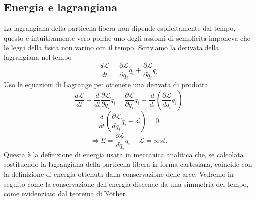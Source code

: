 \documentclass[
10pt, %
a4paper, %
oneside, %
headinclude,footinclude, %
BCOR5mm, %
]{scrartcl}
\begin{document}
\subsection{Energia e lagrangiana}\label{subsec:energia-lagra}
La lagrangiana della particella libera non dipende esplicitamente dal tempo, questo è intuitivamente vero poiché uno degli assiomi di semplicità imponeva che le leggi della fisica non varino con il tempo. Scriviamo la derivata della lagrangiana nel tempo
\[\frac{d\mathcal{L}}{dt} = \frac{\partial \mathcal{L}}{\partial q_i}\dot{q}_i+ \frac{\partial \mathcal{L}}{\partial \dot{q}_i}\ddot{q}_i\]
Uso le equazioni di Lagrange per ottenere una derivata di prodotto
\[\frac{d\mathcal{L}}{dt} = \frac{d}{dt}\frac{\partial \mathcal{L}}{\partial \dot{q}_i}\dot{q}_i+ \frac{\partial \mathcal{L}}{\partial \dot{q}_i}\ddot{q}_i=\frac{d}{dt}\left(\frac{\partial\mathcal{L}}{d\dot{q}_i}\dot{q}_i\right)\]
\[\frac{d}{dt}\left(\frac{\partial\mathcal{L}}{d\dot{q}_i}\dot{q}_i-\mathcal{L}\right)=0\]
\[\Rightarrow E = \frac{\partial\mathcal{L}}{d\dot{q}_i}\dot{q}_i-\mathcal{L}=cost.\]
Questa è la definizione di energia usata in meccanica analitica che, se calcolata sostituendo la lagrangiana della particella libera in forma cartesiana, coincide con la definizione di energia ottenuta dalla conservazione delle aree. Vedremo in seguito come la conservazione dell'energia discende da una simmetria del tempo, come evidenziato dal teorema di N\"{o}ther.
\end{document}
